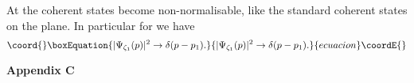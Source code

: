 \documentclass[a4paper,12pt]{article}
\def\theequation{\arabic{section}.\arabic{equation}}
\begin{document}
\noindent
At \coordHE{} the coherent states become non-normalisable, like the standard
coherent states on the plane. In particular for \coordHE{}
we have
\begin{equation}\coord{}\boxEquation{\label{nu=0}
|\Psi_{\zeta_1}(p)|^2 \rightarrow \delta(p-p_1).
}{|\Psi_{\zeta_1}(p)|^2 \rightarrow \delta(p-p_1).
}{ecuacion}\coordE{}\end{equation}

\vspace{0.5cm}

\setcounter{equation}{0}
\def\theequation{C.\arabic{equation}}

{\bf {\Large Appendix C}}

\vspace{0.5cm}
\end{document}
